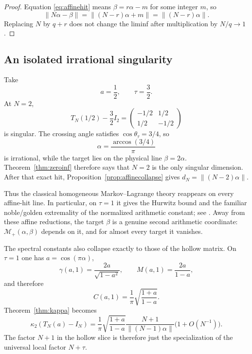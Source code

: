 \documentclass[11pt,reqno]{amsart}
\theoremstyle{plain}
\theoremstyle{definition}
\newcommand{\TN}{T_N}
\newcommand{\norm}[1]{\left\lVert #1\right\rVert}
\begin{document}
\begin{proof}
Equation \eqref{eq:affinehit} means $\beta=r\alpha-m$ for some integer $m$, so
\[
\norm{N\alpha-\beta}
=\norm{(N-r)\alpha+m}
=\norm{(N-r)\alpha}.
\]
Replacing $N$ by $q+r$ does not change the liminf after multiplication by $N/q\to1$.
\end{proof}

\subsection*{An isolated irrational singularity}
Take
\[
a=\frac12,
\qquad
\tau=\frac32.
\]
At $N=2$,
\[
\TN(1/2)-\frac32I_2
=\begin{pmatrix}-1/2&1/2\\1/2&-1/2\end{pmatrix}
\]
is singular.  The crossing angle satisfies
$\cos\theta_\tau=3/4$, so
\[
\alpha=\frac{\arccos(3/4)}{\pi}
\]
is irrational, while the target lies on the physical line $\beta=2\alpha$.
Theorem~\ref{thm:zeroinf} therefore says that $N=2$ is the only singular dimension.
After that exact hit, Proposition~\ref{prop:affinecollapse} gives
$d_N=\norm{(N-2)\alpha}$.


Thus the classical homogeneous Markov--Lagrange theory reappears on every affine-hit
line.  In particular, on $\tau=1$ it gives the Hurwitz bound and the familiar
noble/golden extremality of the normalized arithmetic constant; see
\cite{Hurwitz,CusickFlahive}.  Away from these affine reductions, the target $\beta$
is a genuine second arithmetic coordinate: $\mathcal M_+(\alpha,\beta)$ depends on it,
and for almost every target it vanishes.

The spectral constants also collapse exactly to those of the hollow matrix.  On
$\tau=1$ one has $a=\cos(\pi\alpha)$,
\begin{equation}\label{eq:hollowgamma}
\gamma(a,1)=\frac{2a}{\sqrt{1-a^2}},
\qquad
M(a,1)=\frac{2a}{1-a},
\end{equation}
and therefore
\begin{equation}\label{eq:hollowC}
C(a,1)=\frac1\pi\sqrt{\frac{1+a}{1-a}}.
\end{equation}
Theorem~\ref{thm:kappa} becomes
\begin{equation}\label{eq:hollowkappa}
\kappa_2(\TN(a)-I_N)
=\frac1\pi\sqrt{\frac{1+a}{1-a}}
\frac{N+1}{\norm{(N-1)\alpha}}
\bigl(1+O(N^{-1})\bigr).
\end{equation}
The factor $N+1$ in the hollow slice is therefore just the specialization of the
universal local factor $N+\tau$.
\end{document}
